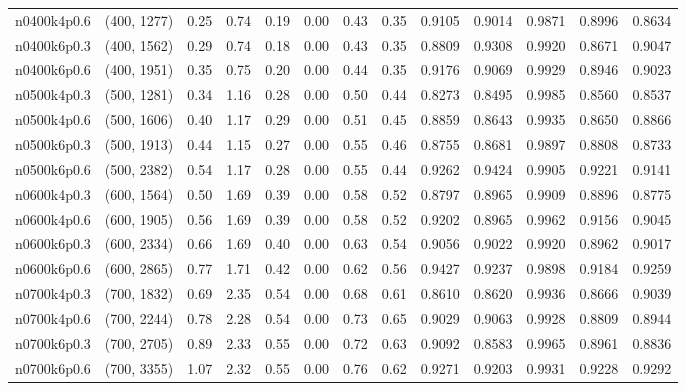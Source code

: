 \begin{tabular}{llrrrrrrrrrrr}
n0400k4p0.6 &   (400, 1277) &   0.25 &   0.74 &  0.19 & 0.00 &  0.43 &   0.35 &   0.9105 &   0.9014 &    0.9871 &     0.8996 &      0.8634 \\
n0400k6p0.3 &   (400, 1562) &   0.29 &   0.74 &  0.18 & 0.00 &  0.43 &   0.35 &   0.8809 &   0.9308 &    0.9920 &     0.8671 &      0.9047 \\
n0400k6p0.6 &   (400, 1951) &   0.35 &   0.75 &  0.20 & 0.00 &  0.44 &   0.35 &   0.9176 &   0.9069 &    0.9929 &     0.8946 &      0.9023 \\
n0500k4p0.3 &   (500, 1281) &   0.34 &   1.16 &  0.28 & 0.00 &  0.50 &   0.44 &   0.8273 &   0.8495 &    0.9985 &     0.8560 &      0.8537 \\
n0500k4p0.6 &   (500, 1606) &   0.40 &   1.17 &  0.29 & 0.00 &  0.51 &   0.45 &   0.8859 &   0.8643 &    0.9935 &     0.8650 &      0.8866 \\
n0500k6p0.3 &   (500, 1913) &   0.44 &   1.15 &  0.27 & 0.00 &  0.55 &   0.46 &   0.8755 &   0.8681 &    0.9897 &     0.8808 &      0.8733 \\
n0500k6p0.6 &   (500, 2382) &   0.54 &   1.17 &  0.28 & 0.00 &  0.55 &   0.44 &   0.9262 &   0.9424 &    0.9905 &     0.9221 &      0.9141 \\
n0600k4p0.3 &   (600, 1564) &   0.50 &   1.69 &  0.39 & 0.00 &  0.58 &   0.52 &   0.8797 &   0.8965 &    0.9909 &     0.8896 &      0.8775 \\
n0600k4p0.6 &   (600, 1905) &   0.56 &   1.69 &  0.39 & 0.00 &  0.58 &   0.52 &   0.9202 &   0.8965 &    0.9962 &     0.9156 &      0.9045 \\
n0600k6p0.3 &   (600, 2334) &   0.66 &   1.69 &  0.40 & 0.00 &  0.63 &   0.54 &   0.9056 &   0.9022 &    0.9920 &     0.8962 &      0.9017 \\
n0600k6p0.6 &   (600, 2865) &   0.77 &   1.71 &  0.42 & 0.00 &  0.62 &   0.56 &   0.9427 &   0.9237 &    0.9898 &     0.9184 &      0.9259 \\
n0700k4p0.3 &   (700, 1832) &   0.69 &   2.35 &  0.54 & 0.00 &  0.68 &   0.61 &   0.8610 &   0.8620 &    0.9936 &     0.8666 &      0.9039 \\
n0700k4p0.6 &   (700, 2244) &   0.78 &   2.28 &  0.54 & 0.00 &  0.73 &   0.65 &   0.9029 &   0.9063 &    0.9928 &     0.8809 &      0.8944 \\
n0700k6p0.3 &   (700, 2705) &   0.89 &   2.33 &  0.55 & 0.00 &  0.72 &   0.63 &   0.9092 &   0.8583 &    0.9965 &     0.8961 &      0.8836 \\
n0700k6p0.6 &   (700, 3355) &   1.07 &   2.32 &  0.55 & 0.00 &  0.76 &   0.62 &   0.9271 &   0.9203 &    0.9931 &     0.9228 &      0.9292 \\

\end{tabular}
